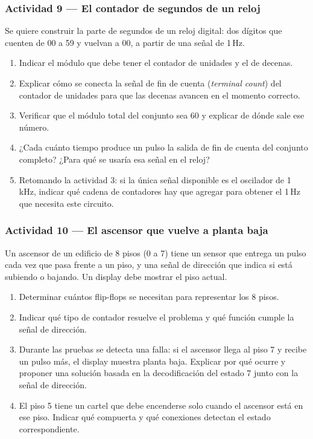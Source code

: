 \subsubsection*{Actividad 9 --- El contador de segundos de un reloj}

Se quiere construir la parte de segundos de un reloj digital: dos dígitos que cuenten de 00 a 59 y vuelvan a 00, a partir de una señal de 1\,Hz.

\begin{enumerate}[label=\alph*)]
    \item Indicar el módulo que debe tener el contador de unidades y el de decenas.
    \item Explicar cómo se conecta la señal de fin de cuenta (\textit{terminal count}) del contador de unidades para que las decenas avancen en el momento correcto.
    \item Verificar que el módulo total del conjunto sea 60 y explicar de dónde sale ese número.
    \item ¿Cada cuánto tiempo produce un pulso la salida de fin de cuenta del conjunto completo? ¿Para qué se usaría esa señal en el reloj?
    \item Retomando la actividad 3: si la única señal disponible es el oscilador de 1\,kHz, indicar qué cadena de contadores hay que agregar para obtener el 1\,Hz que necesita este circuito.
\end{enumerate}

\subsubsection*{Actividad 10 --- El ascensor que vuelve a planta baja}

Un ascensor de un edificio de 8 pisos (0 a 7) tiene un sensor que entrega un pulso cada vez que pasa frente a un piso, y una señal de dirección que indica si está subiendo o bajando. Un display debe mostrar el piso actual.

\begin{enumerate}[label=\alph*)]
    \item Determinar cuántos flip-flops se necesitan para representar los 8 pisos.
    \item Indicar qué tipo de contador resuelve el problema y qué función cumple la señal de dirección.
    \item Durante las pruebas se detecta una falla: si el ascensor llega al piso 7 y recibe un pulso más, el display muestra planta baja. Explicar por qué ocurre y proponer una solución basada en la decodificación del estado 7 junto con la señal de dirección.
    \item El piso 5 tiene un cartel que debe encenderse solo cuando el ascensor está en ese piso. Indicar qué compuerta y qué conexiones detectan el estado correspondiente.
\end{enumerate}

